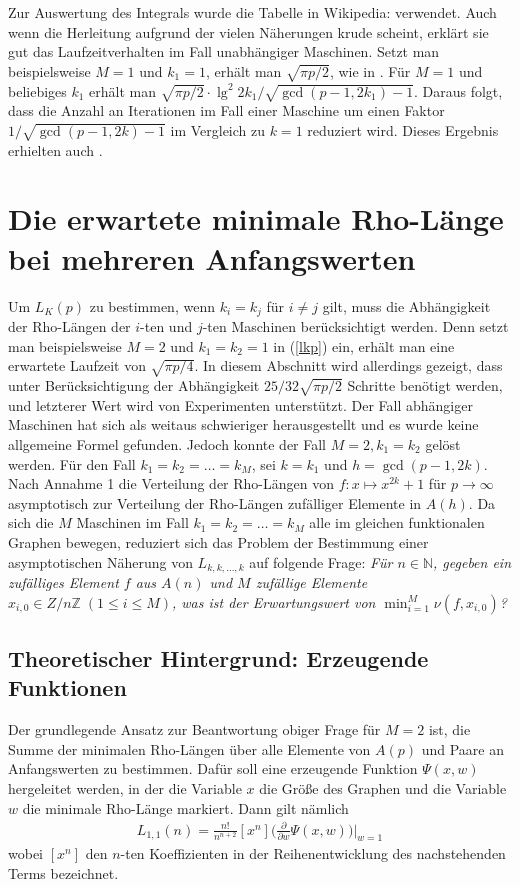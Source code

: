 \documentclass[a4paper, 10pt, ngerman]{article}
\newcommand{\N}{\mathbb{N}}
\newcommand{\Z}{\mathbb{Z}}
\begin{document}
Zur Auswertung des Integrals wurde die Tabelle in Wikipedia: \cite{gint} verwendet. Auch wenn die Herleitung aufgrund der vielen Näherungen krude scheint, erklärt sie gut das Laufzeitverhalten im Fall unabhängiger Maschinen. Setzt man beispielsweise $M = 1$ und $k_1 = 1$, erhält man $\sqrt{\pi p / 2}$, wie in \cite{pol75}. Für $M = 1$ und beliebiges $k_1$ erhält man $\sqrt{\pi p / 2} \cdot \lg^2 2k_1 / \sqrt{\gcd(p-1, 2k_1) - 1}$. Daraus folgt, dass die Anzahl an Iterationen im Fall einer Maschine um einen Faktor $1/\sqrt{\gcd(p - 1, 2k) - 1}$ im Vergleich zu $k = 1$ reduziert wird. Dieses Ergebnis erhielten auch \cite{bp81}.

\section{Die erwartete minimale Rho-Länge bei mehreren Anfangswerten}

Um $L_K(p)$ zu bestimmen, wenn $k_i = k_j$ für $i \ne j$ gilt, muss die Abhängigkeit der Rho-Längen der $i$-ten und $j$-ten Maschinen berücksichtigt werden. Denn setzt man beispielsweise $M = 2$ und $k_1 = k_2 = 1$ in (\ref{lkp}) ein, erhält man eine erwartete Laufzeit von $\sqrt {\pi p / 4}$. In diesem Abschnitt wird allerdings gezeigt, dass unter Berücksichtigung der Abhängigkeit $25/32 \sqrt{\pi p / 2}$ Schritte benötigt werden, und letzterer Wert wird von Experimenten unterstützt. Der Fall abhängiger Maschinen hat sich als weitaus schwieriger herausgestellt und es wurde keine allgemeine Formel gefunden. Jedoch konnte der Fall $M = 2, k_1 = k_2$ gelöst werden. Für den Fall $k_1 = k_2 = \dots = k_M$, sei $k = k_1$ und $h = \gcd(p - 1, 2k)$. Nach Annahme 1 die Verteilung der Rho-Längen von $f : x \mapsto x^{2k} + 1$ für $p \to \infty$ asymptotisch zur Verteilung der Rho-Längen zufälliger Elemente in $A(h)$. Da sich die $M$ Maschinen im Fall $k_1 = k_2 = \dots = k_M$ alle im gleichen funktionalen Graphen bewegen, reduziert sich das Problem der Bestimmung einer asymptotischen Näherung von $L_{k, k, \dots, k}$ auf folgende Frage: \emph{Für $n \in \N$, gegeben ein zufälliges Element $f$ aus $A(n)$ und $M$ zufällige Elemente $x_{i, 0} \in Z/n\Z \; (1 \le i \le M)$, was ist der Erwartungswert von $\min_{i = 1}^M \nu(f, x_{i, 0})$?}

\subsection{Theoretischer Hintergrund: Erzeugende Funktionen}

Der grundlegende Ansatz zur Beantwortung obiger Frage für $M = 2$ ist, die Summe der minimalen Rho-Längen über alle Elemente von $A(p)$ und Paare an Anfangswerten zu bestimmen. Dafür soll eine erzeugende Funktion $\Psi(x, w)$ hergeleitet werden, in der die Variable $x$ die Größe des Graphen und die Variable $w$ die minimale Rho-Länge markiert. Dann gilt nämlich
\begin{align*}
    L_{1, 1}(n) = \frac {n!}{n^{n + 2}} [x^n] \Bigg (\frac {\partial} {\partial w} \Psi(x, w) \Bigg ) \Bigg \vert_{w = 1}
\end{align*}
wobei $[x^n]$ den $n$-ten Koeffizienten in der Reihenentwicklung des nachstehenden Terms bezeichnet.
\end{document}

